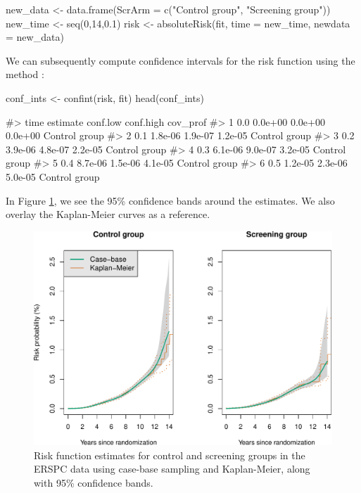 \begin{Schunk}
\begin{Sinput}
new_data <- data.frame(ScrArm = c("Control group", "Screening group"))
new_time <- seq(0,14,0.1)
risk <- absoluteRisk(fit, time = new_time, newdata = new_data)
\end{Sinput}
\end{Schunk}

We can subsequently compute confidence intervals for the risk function
using the method :

\begin{Schunk}
\begin{Sinput}
conf_ints <- confint(risk, fit)
head(conf_ints)
\end{Sinput}
\begin{Soutput}
#>   time estimate conf.low conf.high      cov_prof
#> 1  0.0  0.0e+00  0.0e+00   0.0e+00 Control group
#> 2  0.1  1.8e-06  1.9e-07   1.2e-05 Control group
#> 3  0.2  3.9e-06  4.8e-07   2.2e-05 Control group
#> 4  0.3  6.1e-06  9.0e-07   3.2e-05 Control group
#> 5  0.4  8.7e-06  1.5e-06   4.1e-05 Control group
#> 6  0.5  1.2e-05  2.3e-06   5.0e-05 Control group
\end{Soutput}
\end{Schunk}

In Figure \ref{fig:erspc-cif-conf}, we see the 95\% confidence bands
around the estimates. We also overlay the Kaplan-Meier curves as a
reference.

\begin{Schunk}
\begin{figure}[ht]
\includegraphics[width=\textwidth,keepaspectratio=true]{./erspc-cif-conf-1} \caption[Risk function estimates for control and screening groups in the ERSPC data using case-base sampling and Kaplan-Meier, along with 95\% confidence bands]{Risk function estimates for control and screening groups in the ERSPC data using case-base sampling and Kaplan-Meier, along with 95\% confidence bands.}\label{fig:erspc-cif-conf}
\end{figure}
\end{Schunk}

